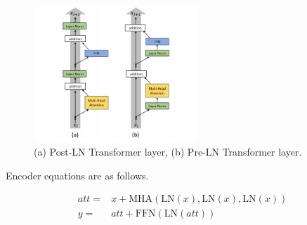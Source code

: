 \begin{figure}
	\centering
	\includegraphics[width=0.55\textwidth]{figures/ml_theory/post_pre_trsf.png}
	\caption{(a) Post-LN Transformer layer, (b) Pre-LN Transformer
		layer.}
	\label{fig:post_pre_trsf}
\end{figure}

Encoder equations are as follows.

\begin{equation}
\begin{split}
att = & x+ \mathrm{MHA}(\mathrm{LN}(x),\mathrm{LN}(x),\mathrm{LN}(x)) \\
y = & att+ \mathrm{FFN}(\mathrm{LN}(att))
\end{split}
\end{equation}




